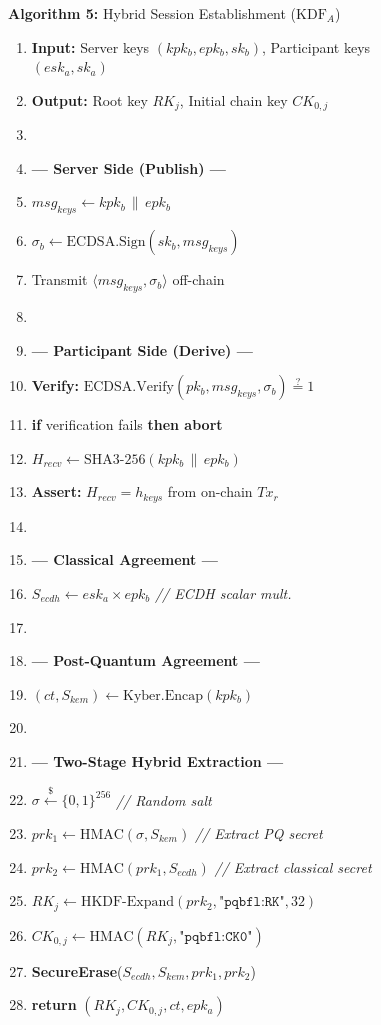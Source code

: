 \documentclass[journal, 10pt, twocolumn]{IEEEtran}
\begin{document}
\begin{figure}[!t]
\hrulefill
\vspace{-0.2cm}
\begin{center}
\textbf{Algorithm 5:} Hybrid Session Establishment ($\text{KDF}_A$)
\end{center}
\vspace{-0.2cm}
\hrulefill
\begin{enumerate}
    \item \textbf{Input:} Server keys $(kpk_b, epk_b, sk_b)$, Participant keys $(esk_a, sk_a)$
    \item \textbf{Output:} Root key $RK_j$, Initial chain key $CK_{0,j}$
    \item[]
    \item[] \textbf{--- Server Side (Publish) ---}
    \item $msg_{keys} \leftarrow kpk_b \,\|\, epk_b$
    \item $\sigma_b \leftarrow \text{ECDSA.Sign}(sk_b, msg_{keys})$
    \item Transmit $\langle msg_{keys}, \sigma_b \rangle$ off-chain
    \item[]
    \item[] \textbf{--- Participant Side (Derive) ---}
    \item \textbf{Verify:} $\text{ECDSA.Verify}(pk_b, msg_{keys}, \sigma_b) \stackrel{?}{=} 1$
    \item \textbf{if} verification fails \textbf{then abort}
    \item $H_{recv} \leftarrow \text{SHA3-256}(kpk_b \,\|\, epk_b)$
    \item \textbf{Assert:} $H_{recv} = h_{keys}$ from on-chain $Tx_r$
    \item[]
    \item[] \textbf{--- Classical Agreement ---}
    \item $S_{ecdh} \leftarrow esk_a \times epk_b$ \quad \textit{// ECDH scalar mult.}
    \item[]
    \item[] \textbf{--- Post-Quantum Agreement ---}
    \item $(ct, S_{kem}) \leftarrow \text{Kyber.Encap}(kpk_b)$
    \item[]
    \item[] \textbf{--- Two-Stage Hybrid Extraction ---}
    \item $\sigma \xleftarrow{\$} \{0,1\}^{256}$ \quad \textit{// Random salt}
    \item $prk_1 \leftarrow \text{HMAC}(\sigma, S_{kem})$ \quad \textit{// Extract PQ secret}
    \item $prk_2 \leftarrow \text{HMAC}(prk_1, S_{ecdh})$ \quad \textit{// Extract classical secret}
    \item $RK_j \leftarrow \text{HKDF-Expand}(prk_2, \texttt{"pqbfl:RK"}, 32)$
    \item $CK_{0,j} \leftarrow \text{HMAC}(RK_j, \texttt{"pqbfl:CK0"})$
    \item \textbf{SecureErase}($S_{ecdh}, S_{kem}, prk_1, prk_2$)
    \item \textbf{return} $(RK_j, CK_{0,j}, ct, epk_a)$
\end{enumerate}
\hrulefill
\end{figure}
\end{document}
